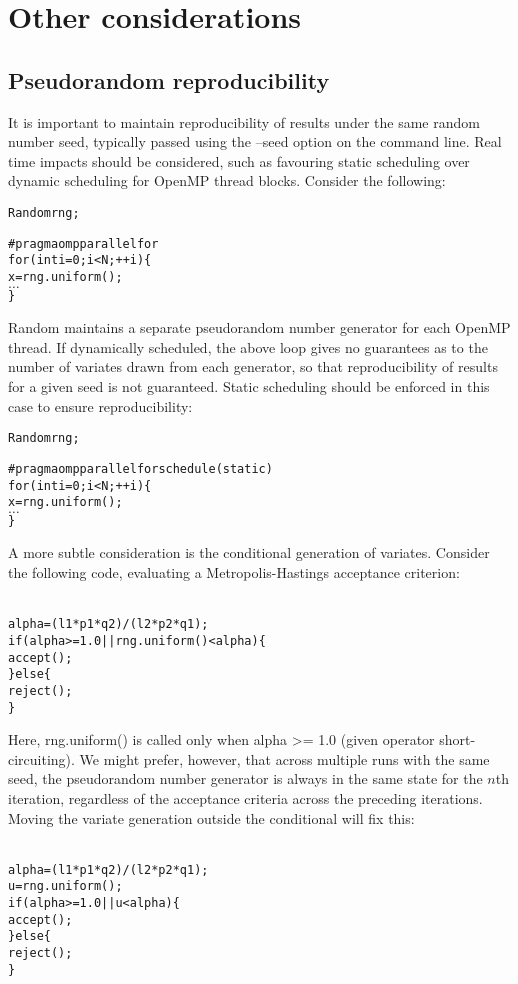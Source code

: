 \section{Other considerations}

\subsection{Pseudorandom reproducibility\label{Pseudorandom_reproducibility}}

It is important to maintain reproducibility of results under the same random
number seed, typically passed using the
\textsf{--seed} option on the command line. Real time impacts should be
considered, such as favouring static scheduling over
dynamic scheduling for OpenMP thread
blocks. Consider the following:
\begin{alltt}{\sf
    Random rng;

    #pragma omp parallel for
    for (int i = 0; i < N; ++i) \{
       x = rng.uniform();
       \(\ldots\)
    \}
}\end{alltt}

\textsf{Random} maintains a separate pseudorandom number
generator for each OpenMP thread. If
dynamically scheduled, the above loop gives no guarantees as to the number of
variates drawn from each generator, so that reproducibility of results for a
given seed is not guaranteed. Static scheduling should be enforced in this
case to ensure reproducibility:
\begin{alltt}{\sf
    Random rng;

    #pragma omp parallel for schedule(static)
    for (int i = 0; i < N; ++i) \{
       x = rng.uniform();
       \(\ldots\)
    \}
}\end{alltt}

A more subtle consideration is the conditional generation of
variates. Consider the following code, evaluating a
Metropolis-Hastings acceptance criterion:
\begin{alltt}{\sf
    alpha = (l1*p1*q2)/(l2*p2*q1);
    if (alpha >= 1.0 || rng.uniform() < alpha) \{
      accept();
    \} else \{
      reject();
    \}
}\end{alltt}
Here, \textsf{rng.uniform()} is called only when \textsf{alpha >= 1.0} (given
operator short-circuiting). We might prefer, however, that across multiple
runs with the same seed, the pseudorandom number generator is always in the
same state for the $n$th iteration, regardless of the acceptance criteria
across the preceding iterations. Moving the variate generation outside the
conditional will fix this:
\begin{alltt}{\sf
    alpha = (l1*p1*q2)/(l2*p2*q1);
    u = rng.uniform();
    if (alpha >= 1.0 || u < alpha) \{
      accept();
    \} else \{
      reject();
    \}
}\end{alltt}
